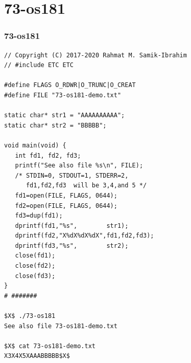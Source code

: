 \documentclass[xcolor=table, notheorems, hyperref={pdfpagelabels=false}]{beamer}
\begin{document}
\section{73-os181}
\begin{frame}[fragile]
\frametitle{73-os181}
\begin{lstlisting}[basicstyle=\ttfamily\tiny]
// Copyright (C) 2017-2020 Rahmat M. Samik-Ibrahim
// #include ETC ETC

#define FLAGS O_RDWR|O_TRUNC|O_CREAT
#define FILE "73-os181-demo.txt"

static char* str1 = "AAAAAAAAAA";
static char* str2 = "BBBBB";

void main(void) {
   int fd1, fd2, fd3;
   printf("See also file %s\n", FILE);
   /* STDIN=0, STDOUT=1, STDERR=2,
      fd1,fd2,fd3  will be 3,4,and 5 */
   fd1=open(FILE, FLAGS, 0644);
   fd2=open(FILE, FLAGS, 0644);
   fd3=dup(fd1);
   dprintf(fd1,"%s",        str1);
   dprintf(fd2,"X%dX%dX%dX",fd1,fd2,fd3);
   dprintf(fd3,"%s",        str2);
   close(fd1);
   close(fd2);
   close(fd3);
}
# #######

$X$ ./73-os181 
See also file 73-os181-demo.txt

$X$ cat 73-os181-demo.txt 
X3X4X5XAAABBBBB$X$

\end{lstlisting}
\end{frame}

\end{document}
